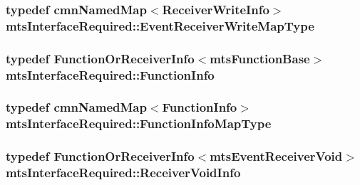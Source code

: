 \hypertarget{classmts_interface_required_a58a4a6a94697fbb23d2884cf6cbf2a0b}{
\subsubsection[{Event\-Receiver\-Write\-Map\-Type}]{\setlength{\rightskip}{0pt plus 5cm}typedef {\bf cmn\-Named\-Map}$<${\bf Receiver\-Write\-Info}$>$ {\bf mts\-Interface\-Required\-::\-Event\-Receiver\-Write\-Map\-Type}\hspace{0.3cm}{\ttfamily [protected]}}}\label{classmts_interface_required_a58a4a6a94697fbb23d2884cf6cbf2a0b}
\hypertarget{classmts_interface_required_ade456f015f7ec3569d23f4a29a147ede}{
\subsubsection[{Function\-Info}]{\setlength{\rightskip}{0pt plus 5cm}typedef {\bf Function\-Or\-Receiver\-Info}$<${\bf mts\-Function\-Base}$>$ {\bf mts\-Interface\-Required\-::\-Function\-Info}}}\label{classmts_interface_required_ade456f015f7ec3569d23f4a29a147ede}
\hypertarget{classmts_interface_required_a4c21eaf53811c5782bae6293904cffe5}{
\subsubsection[{Function\-Info\-Map\-Type}]{\setlength{\rightskip}{0pt plus 5cm}typedef {\bf cmn\-Named\-Map}$<${\bf Function\-Info}$>$ {\bf mts\-Interface\-Required\-::\-Function\-Info\-Map\-Type}\hspace{0.3cm}{\ttfamily [protected]}}}\label{classmts_interface_required_a4c21eaf53811c5782bae6293904cffe5}
\hypertarget{classmts_interface_required_a7ddf0b5c0205b5a512562171275ff1c3}{
\subsubsection[{Receiver\-Void\-Info}]{\setlength{\rightskip}{0pt plus 5cm}typedef {\bf Function\-Or\-Receiver\-Info}$<${\bf mts\-Event\-Receiver\-Void}$>$ {\bf mts\-Interface\-Required\-::\-Receiver\-Void\-Info}}}\label{classmts_interface_required_a7ddf0b5c0205b5a512562171275ff1c3}
